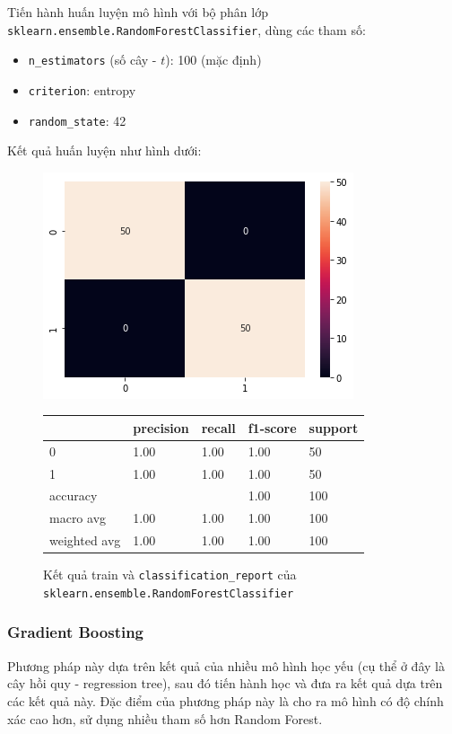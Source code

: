 \documentclass[12pt]{article}
\begin{document}
Tiến hành huấn luyện mô hình với bộ phân lớp \texttt{sklearn.ensemble.RandomForestClassifier}, dùng các tham số:
\begin{itemize}
\item \texttt{n\_estimators} (số cây - $t$): 100 (mặc định)
\item \texttt{criterion}: entropy
\item \texttt{random\_state}: 42
\end{itemize}
 Kết quả huấn luyện như hình dưới:

\begin{figure}[H]
	\begin{multicols}{2}
		\includegraphics[scale=.5]{img/train-rf-result.png}

		\begin{table}[H]
			\begin{tabular}{l l l l l}
				\hline
				& precision & recall & f1-score & support \\
				\hline
				0 & 1.00 & 1.00 & 1.00 & 50 \\
				1 & 1.00 & 1.00 & 1.00 & 50 \\
				accuracy &   &   & 1.00 & 100 \\
				macro avg & 1.00 & 1.00 & 1.00 & 100 \\
				weighted avg & 1.00 & 1.00 & 1.00 & 100 \\
				\hline
			\end{tabular}
		\end{table}
	\end{multicols}
	\caption{Kết quả train và \texttt{classification\_report} của \texttt{sklearn.ensemble.RandomForestClassifier}}
\end{figure}

\subsubsection{Gradient Boosting}
Phương pháp này dựa trên kết quả của nhiều mô hình học yếu (cụ thể ở đây là cây hồi quy - regression tree), sau đó tiến hành học và đưa ra kết quả dựa trên các kết quả này. Đặc điểm của phương pháp này là cho ra mô hình có độ chính xác cao hơn, sử dụng nhiều tham số hơn Random Forest.
\end{document}
